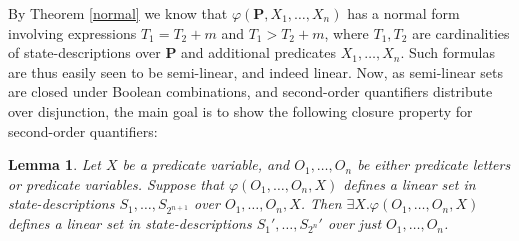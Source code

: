 \documentclass[12pt,oneside,reqno]{amsart}
\newtheorem{lemma}{Lemma}
\theoremstyle{definition}
\begin{document}
By Theorem \ref{normal} we know that $\varphi(\mathbf{P},X_1,\dots,X_n)$ has a normal form involving  expressions $T_1=T_2+m$ and $T_1 > T_2+m$, where $T_1,T_2$ are cardinalities of state-descriptions over $\mathbf{P}$ and additional predicates $X_1,\dots,X_n$. Such formulas are thus easily seen to be semi-linear, and indeed linear. Now, as semi-linear sets are closed under Boolean combinations, and second-order quantifiers distribute over disjunction, the main goal is to show the following closure property for second-order quantifiers:
\begin{lemma} Let $X$ be a predicate variable, and $O_1,\dots,O_n$ be either predicate letters or predicate variables. Suppose that $\varphi(O_1,\dots,O_n,X)$ defines a linear set in state-descriptions $S_1,\dots,S_{2^{n+1}}$ over $O_1,\dots,O_n,X$. Then $\exists X. \varphi(O_1,\dots,O_n,X)$ defines a linear set in state-descriptions $S_1',\dots,S_{2^n}'$ over just $O_1,\dots,O_n$.
\end{lemma}
\end{document}
